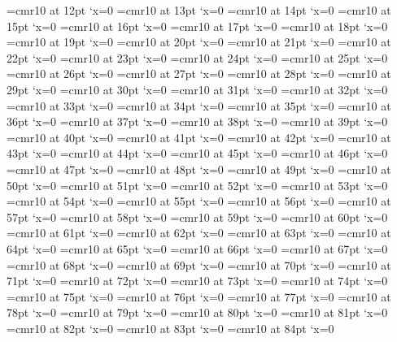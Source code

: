 \font\F=cmr10 at 12pt \lpcode\F`x=0
\font\F=cmr10 at 13pt \lpcode\F`x=0
\font\F=cmr10 at 14pt \lpcode\F`x=0
\font\F=cmr10 at 15pt \lpcode\F`x=0
\font\F=cmr10 at 16pt \lpcode\F`x=0
\font\F=cmr10 at 17pt \lpcode\F`x=0
\font\F=cmr10 at 18pt \lpcode\F`x=0
\font\F=cmr10 at 19pt \lpcode\F`x=0
\font\F=cmr10 at 20pt \lpcode\F`x=0
\font\F=cmr10 at 21pt \lpcode\F`x=0
\font\F=cmr10 at 22pt \lpcode\F`x=0
\font\F=cmr10 at 23pt \lpcode\F`x=0
\font\F=cmr10 at 24pt \lpcode\F`x=0
\font\F=cmr10 at 25pt \lpcode\F`x=0
\font\F=cmr10 at 26pt \lpcode\F`x=0
\font\F=cmr10 at 27pt \lpcode\F`x=0
\font\F=cmr10 at 28pt \lpcode\F`x=0
\font\F=cmr10 at 29pt \lpcode\F`x=0
\font\F=cmr10 at 30pt \lpcode\F`x=0
\font\F=cmr10 at 31pt \lpcode\F`x=0
\font\F=cmr10 at 32pt \lpcode\F`x=0
\font\F=cmr10 at 33pt \lpcode\F`x=0
\font\F=cmr10 at 34pt \lpcode\F`x=0
\font\F=cmr10 at 35pt \lpcode\F`x=0
\font\F=cmr10 at 36pt \lpcode\F`x=0
\font\F=cmr10 at 37pt \lpcode\F`x=0
\font\F=cmr10 at 38pt \lpcode\F`x=0
\font\F=cmr10 at 39pt \lpcode\F`x=0
\font\F=cmr10 at 40pt \lpcode\F`x=0
\font\F=cmr10 at 41pt \lpcode\F`x=0
\font\F=cmr10 at 42pt \lpcode\F`x=0
\font\F=cmr10 at 43pt \lpcode\F`x=0
\font\F=cmr10 at 44pt \lpcode\F`x=0
\font\F=cmr10 at 45pt \lpcode\F`x=0
\font\F=cmr10 at 46pt \lpcode\F`x=0
\font\F=cmr10 at 47pt \lpcode\F`x=0
\font\F=cmr10 at 48pt \lpcode\F`x=0
\font\F=cmr10 at 49pt \lpcode\F`x=0
\font\F=cmr10 at 50pt \lpcode\F`x=0
\font\F=cmr10 at 51pt \lpcode\F`x=0
\font\F=cmr10 at 52pt \lpcode\F`x=0
\font\F=cmr10 at 53pt \lpcode\F`x=0
\font\F=cmr10 at 54pt \lpcode\F`x=0
\font\F=cmr10 at 55pt \lpcode\F`x=0
\font\F=cmr10 at 56pt \lpcode\F`x=0
\font\F=cmr10 at 57pt \lpcode\F`x=0
\font\F=cmr10 at 58pt \lpcode\F`x=0
\font\F=cmr10 at 59pt \lpcode\F`x=0
\font\F=cmr10 at 60pt \lpcode\F`x=0
\font\F=cmr10 at 61pt \lpcode\F`x=0
\font\F=cmr10 at 62pt \lpcode\F`x=0
\font\F=cmr10 at 63pt \lpcode\F`x=0
\font\F=cmr10 at 64pt \lpcode\F`x=0
\font\F=cmr10 at 65pt \lpcode\F`x=0
\font\F=cmr10 at 66pt \lpcode\F`x=0
\font\F=cmr10 at 67pt \lpcode\F`x=0
\font\F=cmr10 at 68pt \lpcode\F`x=0
\font\F=cmr10 at 69pt \lpcode\F`x=0
\font\F=cmr10 at 70pt \lpcode\F`x=0
\font\F=cmr10 at 71pt \lpcode\F`x=0
\font\F=cmr10 at 72pt \lpcode\F`x=0
\font\F=cmr10 at 73pt \lpcode\F`x=0
\font\F=cmr10 at 74pt \lpcode\F`x=0
\font\F=cmr10 at 75pt \lpcode\F`x=0
\font\F=cmr10 at 76pt \lpcode\F`x=0
\font\F=cmr10 at 77pt \lpcode\F`x=0
\font\F=cmr10 at 78pt \lpcode\F`x=0
\font\F=cmr10 at 79pt \lpcode\F`x=0
\font\F=cmr10 at 80pt \lpcode\F`x=0
\font\F=cmr10 at 81pt \lpcode\F`x=0
\font\F=cmr10 at 82pt \lpcode\F`x=0
\font\F=cmr10 at 83pt \lpcode\F`x=0
\font\F=cmr10 at 84pt \lpcode\F`x=0

